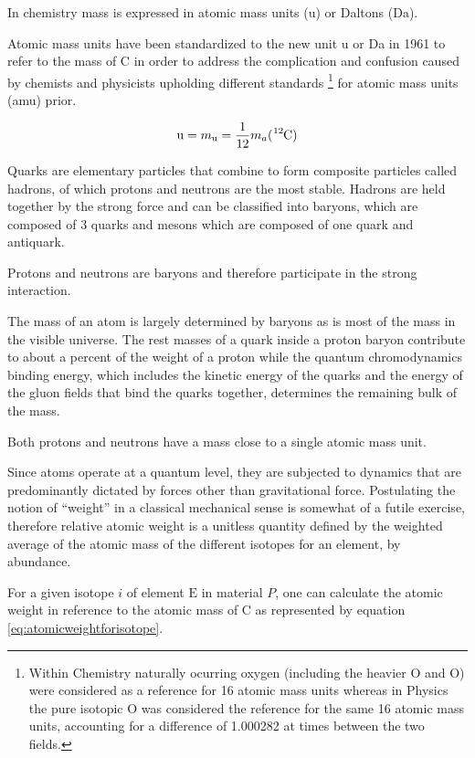 In chemistry mass is expressed in atomic mass units (\si{\atomicmassunit}) or
Daltons (\si{\dalton}).

Atomic mass units have been standardized to the new
unit \si{\atomicmassunit} or \si{\dalton} in 1961 to refer to the mass of
C in order to address the complication and confusion caused by
chemists and physicists upholding different standards
\footnote{Within Chemistry naturally ocurring oxygen (including the heavier
O and O) were considered as a reference for 16 atomic mass
units whereas in Physics the pure isotopic O was considered the
reference for the same 16 atomic mass units, accounting for a difference of
\num{1.000282} at times between the two fields.} for atomic mass units (amu)
prior.

$$\mathrm {u} =m_{\mathrm {u} }={\frac {1}{12}} m_a(\mathrm{ \ce{^{12}}C })$$

Quarks are elementary particles that combine to form composite particles called
hadrons, of which protons and neutrons are the most stable. Hadrons are held
together by the strong force and can be classified into baryons, which are
composed of 3 quarks and mesons which are composed of one quark and antiquark.

Protons and neutrons are baryons and therefore participate in the strong
interaction.

The mass of an atom is largely determined by baryons as is most of the mass
in the visible universe. The rest masses of a quark inside a proton baryon
contribute to about a percent of the weight of a proton while the quantum
chromodynamics binding energy, which includes the kinetic energy of the quarks
and the energy of the gluon fields that bind the quarks together, determines
the remaining bulk of the mass.

Both protons and neutrons have a mass close to a single atomic mass unit.


Since atoms operate at a quantum level, they are subjected to dynamics that
are predominantly dictated by forces other than gravitational force.
Postulating the notion of ``weight'' in a classical mechanical sense
is somewhat of a futile exercise, therefore relative atomic weight is a
unitless quantity defined by the weighted average of the atomic mass of the
different isotopes for an element, by abundance.

For a given isotope $i$ of element $\mathrm E$ in material $P$, one can
calculate the atomic weight in reference to the atomic mass of C
as represented by equation \ref{eq:atomicweightforisotope}.

